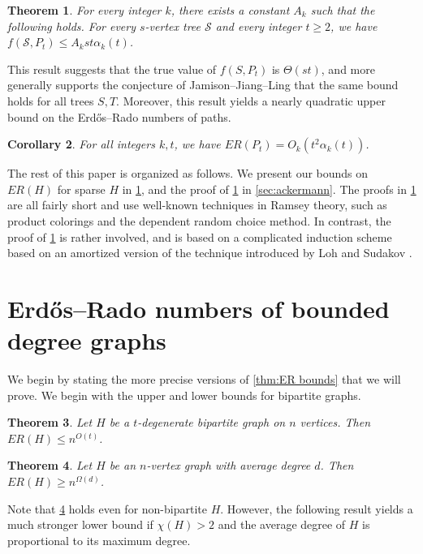 \documentclass[a4paper,11pt]{article}
\newtheorem{theorem}{\bf Theorem}[section]
\newtheorem{corollary}[theorem]{\bf Corollary}
\theoremstyle{definition}
\def\cS{\mathcal{S}}
\begin{document}
\begin{theorem}\label{thm:main}
For every integer $k$, there exists a constant $A_k$ such that the following holds. For every $s$-vertex tree $\cS$ and every integer $t\geq 2$, we have $f(\cS, P_t)\leq A_k s t \alpha_k(t)$.
\end{theorem}
This result suggests that the true value of $f(S,P_t)$ is $\Theta(st)$, and more generally supports the conjecture of Jamison--Jiang--Ling that the same bound holds for all trees $S,T$. Moreover, this result yields a nearly quadratic upper bound on the Erd\H os--Rado numbers of paths.
\begin{corollary}
    For all integers $k,t$, we have $ER(P_t) = O_k(t^2 \alpha_k(t))$.
\end{corollary}

The rest of this paper is organized as follows. We present our bounds on $ER(H)$ for sparse $H$ in \cref{sec:bounded deg}, and the proof of \cref{thm:main} in \cref{sec:ackermann}. The proofs in \cref{sec:bounded deg} are all fairly short and use well-known techniques in Ramsey theory, such as product colorings and the dependent random choice method. In contrast, the proof of \cref{thm:main} is rather involved, and is based on a complicated induction scheme based on an amortized version of the technique introduced by Loh and Sudakov \cite{LS09}.

\section{Erd\H{o}s--Rado numbers of bounded degree graphs}\label{sec:bounded deg}

We begin by stating the more precise versions of \cref{thm:ER bounds} that we will prove. We begin with the upper and lower bounds for bipartite graphs.

\begin{theorem}\label{thm:upper bound bipartite}
Let $H$ be a $t$-degenerate bipartite graph on $n$ vertices. Then $ER(H)\leq n^{O(t)}$.
\end{theorem}

\begin{theorem}\label{thm:lower bound bipartite}
Let $H$ be an $n$-vertex graph with average degree $d$. Then $ER(H) \geq n^{\Omega(d)}$.
\end{theorem}
Note that \cref{thm:lower bound bipartite} holds even for non-bipartite $H$. However, the following result yields a much stronger lower bound if $\chi(H)>2$ and the average degree of $H$ is proportional to its maximum degree.
\end{document}
